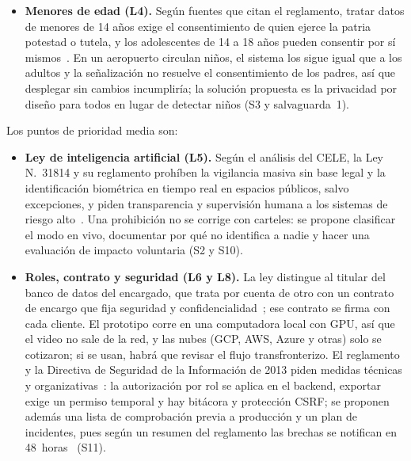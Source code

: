 \documentclass[12pt,a4paper]{article}
\begin{document}
\begin{itemize}
    \item \textbf{Menores de edad (L4).} Según fuentes que citan el reglamento,
    tratar datos de menores de 14 años exige el consentimiento de quien ejerce la
    patria potestad o tutela, y los adolescentes de 14 a 18 años pueden
    consentir por sí mismos~\cite{reglamento29733,comexperu-menores}. En un aeropuerto circulan
    niños, el sistema los sigue igual que a los adultos y la señalización no
    resuelve el consentimiento de los padres, así que desplegar sin cambios
    incumpliría; la solución propuesta es la privacidad por diseño para todos
    en lugar de detectar niños (S3 y salvaguarda~1).
\end{itemize}

Los puntos de prioridad media son:

\begin{itemize}
    \item \textbf{Ley de inteligencia artificial (L5).} Según el análisis del
    CELE, la Ley N.\textdegree~31814 y su reglamento prohíben la vigilancia
    masiva sin base legal y la identificación biométrica en tiempo real en
    espacios públicos, salvo excepciones, y piden transparencia y supervisión
    humana a los sistemas de riesgo alto~\cite{cele-ia,cuatrecasas-ia}. Una
    prohibición no se corrige con carteles: se propone clasificar el modo en vivo,
    documentar por qué no identifica a nadie y hacer una evaluación de impacto
    voluntaria (S2 y S10).

    \item \textbf{Roles, contrato y seguridad (L6 y L8).} La ley distingue al
    titular del banco de datos del encargado, que trata por cuenta de otro con
    un contrato de encargo que fija seguridad y confidencialidad~\cite{ley29733};
    ese contrato se firma con cada cliente. El prototipo corre en una computadora local con
    GPU, así que el video no sale de la red, y las nubes (GCP, AWS, Azure y
    otras) solo se cotizaron; si se usan, habrá que revisar el flujo
    transfronterizo. El reglamento y la Directiva de Seguridad de la Información
    de 2013 piden medidas técnicas y organizativas~\cite{reglamento29733,matrices2026}:
    la autorización por rol se aplica en el backend, exportar exige un permiso
    temporal y hay bitácora y protección CSRF; se proponen además una lista de
    comprobación previa a producción y un plan de incidentes, pues según un
    resumen del reglamento las brechas se notifican en 48~horas~\cite{recordinglaw}
    (S11).


\end{itemize}
\end{document}
